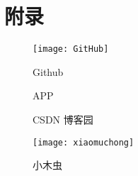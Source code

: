 \documentclass{article}
\begin{document}
\section{附录}
\begin{figure}[h]
	\centering
	\texttt{[image: GitHub]}
	\caption{Github}
	\label{fig:github}
\end{figure}
\begin{figure}[h]
	\centering
	\caption{APP}
	\label{Fig.main}
\end{figure}
\begin{figure}[h]
	\centering
	\caption{CSDN 博客园}
	\label{Fig.main}
\end{figure}
\begin{figure}[h]
	\centering
	\texttt{[image: xiaomuchong]}
	\caption{小木虫}
	\label{fig:xiaomuchong}
\end{figure}
\hspace*{\fill} \\
\end{document}
